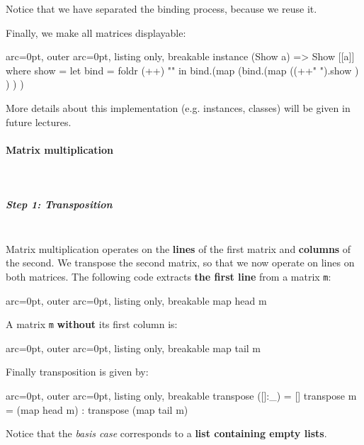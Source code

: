 Notice that we have separated the binding process, because we reuse it.

Finally, we make all matrices displayable:

\begin{tcblisting}{ arc=0pt, outer arc=0pt, listing only, breakable}
instance (Show a) => Show [[a]] where
    show = 
        let bind = foldr (++) "\n"
        in bind.(map (bind.(map ((++" ").show ) ) ) )

\end{tcblisting}

More details about this implementation (e.g. instances, classes) will be given in future lectures.
        
\paragraph{ Matrix multiplication }\hfill\\

\subparagraph{ Step 1: Transposition }\hfill\\

Matrix multiplication operates on the \textbf{lines} of the first matrix and \textbf{columns} of the second. We transpose the second matrix, so that we now operate on lines on both matrices. The following code extracts \textbf{the first line} from a matrix \texttt{m}:

\begin{tcblisting}{ arc=0pt, outer arc=0pt, listing only, breakable}
map head m

\end{tcblisting}

A matrix \texttt{m} \textbf{without} its first column is:

\begin{tcblisting}{ arc=0pt, outer arc=0pt, listing only, breakable}
map tail m

\end{tcblisting}

Finally transposition is given by:

\begin{tcblisting}{ arc=0pt, outer arc=0pt, listing only, breakable}
transpose ([]:_) = []
transpose m = (map head m) : transpose (map tail m)

\end{tcblisting}

Notice that the \textit{basis case} corresponds to a \textbf{list containing empty lists}.

